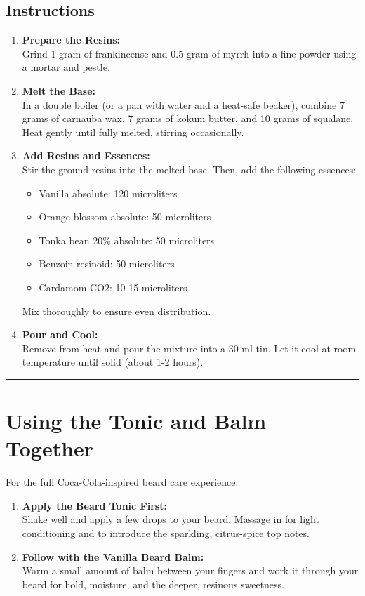 \documentclass{article}
\begin{document}
\subsection*{Instructions}

\begin{enumerate}[leftmargin=*]
\item \textbf{Prepare the Resins:}\\
   Grind 1 gram of frankincense and 0.5 gram of myrrh into a fine powder using a mortar and pestle.

\item \textbf{Melt the Base:}\\
   In a double boiler (or a pan with water and a heat-safe beaker), combine 7 grams of carnauba wax, 7 grams of kokum butter, and 10 grams of squalane. Heat gently until fully melted, stirring occasionally.

\item \textbf{Add Resins and Essences:}\\
   Stir the ground resins into the melted base. Then, add the following essences:
   \begin{itemize}
     \item Vanilla absolute: 120 microliters
     \item Orange blossom absolute: 50 microliters
     \item Tonka bean 20\% absolute: 50 microliters
     \item Benzoin resinoid: 50 microliters
     \item Cardamom CO2: 10-15 microliters
   \end{itemize}
   Mix thoroughly to ensure even distribution.

\item \textbf{Pour and Cool:}\\
   Remove from heat and pour the mixture into a 30 ml tin. Let it cool at room temperature until solid (about 1-2 hours).
\end{enumerate}

\vspace{1em}
\hrule
\vspace{1em}

\section*{Using the Tonic and Balm Together}

For the full Coca-Cola-inspired beard care experience:

\begin{enumerate}[leftmargin=*]
\item \textbf{Apply the Beard Tonic First:}\\
   Shake well and apply a few drops to your beard. Massage in for light conditioning and to introduce the sparkling, citrus-spice top notes.

\item \textbf{Follow with the Vanilla Beard Balm:}\\
   Warm a small amount of balm between your fingers and work it through your beard for hold, moisture, and the deeper, resinous sweetness.
\end{enumerate}
\end{document}
